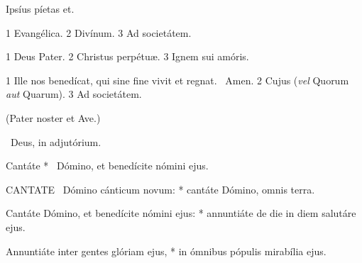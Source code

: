 
 Ipsíus píetas et.


 1 Evangélica. 2 Divínum. 3 Ad societátem.


 1 Deus Pater. 2 Christus perpétuæ. 3 Ignem sui amóris.


 1 Ille nos benedícat, qui sine fine vivit et regnat. \R\ Amen. 2 Cujus (\textit{vel} Quorum \textit{aut} Quarum). 3 Ad societátem.



(Pater noster et Ave.)

\V\ Deus, in adjutórium.

 Cantáte * \textdagger\ Dómino, et benedícite nómini ejus.


\lettrine[lines=2]{C}{ANTATE} \textdagger\ Dómino cánticum novum: * cantáte Dómino, omnis terra.

Cantáte Dómino, et benedícite nómini ejus: * annuntiáte de die in diem salutáre ejus.

Annuntiáte inter gentes glóriam ejus, * in ómnibus pópulis mirabília ejus.

